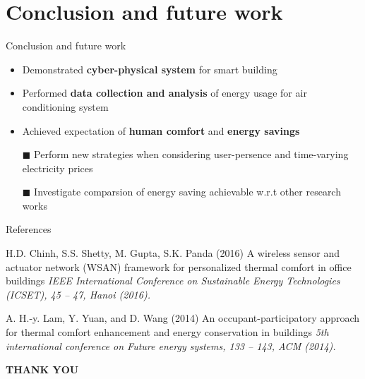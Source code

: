 \documentclass[aspectratio=169]{beamer}
\begin{document}
\section{Conclusion and future work}
\begin{frame}{Conclusion and future work}
    \begin{itemize}[label=]
        \item Demonstrated \textbf{cyber-physical system} for smart building
        \item Performed \textbf{data collection and analysis} of energy usage for air conditioning system
        \item Achieved expectation of \textbf{human comfort} and \textbf{energy savings}
    \end{itemize}
    \hspace{5mm}
    \hspace{5mm}
    \begin{itemize}
        \item[$\blacksquare$] Perform new strategies when considering user-persence and time-varying electricity prices
        \item[$\blacksquare$] Investigate comparsion of energy saving achievable w.r.t other research works
    \end{itemize}
\end{frame}



\begin{frame}{References}
    \footnotesize{
    \begin{thebibliography}{99} %
         H.D. Chinh, S.S. Shetty, M. Gupta, S.K. Panda (2016)
        \newblock A wireless sensor and actuator network (WSAN) framework for personalized thermal comfort in office buildings
        \newblock \emph{IEEE International Conference on Sustainable Energy Technologies (ICSET), 45 -- 47, Hanoi (2016).}
    \end{thebibliography}
    \begin{thebibliography}{99} %
         A. H.-y. Lam, Y. Yuan, and D. Wang (2014)
        \newblock An occupant-participatory approach for thermal comfort enhancement and energy conservation in buildings
        \newblock \emph{5th international conference on Future energy systems, 133 -- 143, ACM (2014).}
    \end{thebibliography}
    }
\end{frame}


\begin{frame}
\Huge{\centerline{\textbf{THANK YOU}}}
\end{frame}

\end{document}
